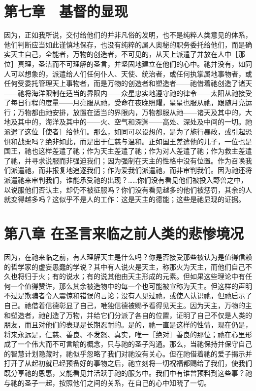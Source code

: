 
\section{第七章　基督的显现}

因为，正如我所说，交付给他们的并非凡俗的发明，也不是纯粹人类意见的体系，他们判断应当如此谨慎地保存，也没有纯粹的属人奥秘的职务委托给他们，而是确实天主自己，全能者，万物的创造者，不可见的，从天上派遣了并放在人中［那位］真理，圣洁而不可理解的圣言，并坚固地建立在他们的心中。祂并没有，如同人可以想象的，派遣给人们任何仆人、天使、统治者，或任何执掌属地事物者，或任何受委托管理天上事物者，而是万物的创造者和塑造者——祂借着祂创造了诸天——祂将海洋限制在适当的界限内——众星忠实地遵守祂的律令——太阳从祂接受了每日行程的度量——月亮服从祂，受命在夜晚照耀，星星也服从祂，跟随月亮运行；万物都由祂安排，放置在适当的界限内，万物都服从祂——诸天及其中的，大地及其中的，海洋及其中的——火、空气和深渊——高处、深处及中间的一切。祂派遣了这位［使者］给他们。那么，如同可以设想的，是为了施行暴政，或引起恐惧和战栗吗？绝非如此，而是出于仁慈与温和。正如国王差遣他的儿子，一位也是国王，祂也这样差遣了祂；作为天主差遣了祂；作为对人差遣了祂；作为救主差遣了祂，并寻求说服而非强迫我们；因为强制在天主的性格中没有位置。作为召唤我们派遣祂，而非报复地追逐我们；作为爱我们派遣祂，而非审判我们。因为祂还将派遣祂来审判我们，谁能承受祂的出现？……你们没有看见他们被投入野兽之中，以说服他们否认主，却仍不被征服吗？你们没有看见越多的他们被惩罚，其余的人就变得越多吗？这似乎不是人的工作：这是天主的德能；这些是祂显现的证据。\par


\section{第八章 在圣言来临之前人类的悲惨境况}

因为，在祂来临之前，有人理解天主是什么吗？你是否接受那些被认为是值得信赖的哲学家的虚妄愚蠢的学说？其中有人说火是天主，称那火为天主，而他们自己不久也将归于火；有的说水；有的说其他由天主形成的元素。但如果这些理论中有任何一个值得赞许，那么其余被造物中的每一个也可能被宣称为天主。但这样的声明不过是欺骗者令人震惊和错误的言论；没有人见过祂，或使人认识祂，但祂启示了自己。祂借着信德彰显了自己，唯独信德被赐予看得见天主。因为天主，万物的主和塑造者，祂创造了万物，并给它们分派了各自的位置，证明了自己不仅是人类的朋友，而且对他们的表现是长期忍耐的。是的，祂一直是这样的性情，现在仍是，将来永远是，仁慈、善良、不发怒、真实，唯一［绝对］善良的那位；祂在心里形成了一个伟大而不可言喻的概念，只与祂的圣子沟通。那么，当祂保持并保守自己的智慧计划隐藏时，祂似乎忽略了我们对祂没有关心。但在祂借着祂的爱子揭示并打开了从起初就已经预备好的事物之后，祂立刻将一切祝福都赐给了我们，使我们既分享祂的恩惠，又能看见并活跃于祂的服务中。我们中有谁曾预料到这些事？祂与祂的圣子一起，按照他们之间的关系，在自己的心中知晓了一切。\par

